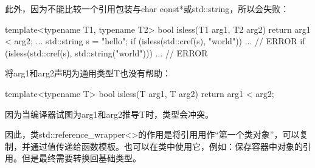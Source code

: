 此外，因为不能比较一个引用包装与char const*或std::string，所以会失败：

\begin{cpp}
template<typename T1, typename T2>
bool isless(T1 arg1, T2 arg2)
{
	return arg1 < arg2;
}
...
std::string s = "hello";
if (isless(std::cref(s), "world")) ... // ERROR
if (isless(std::cref(s), std::string("world"))) ... // ERROR
\end{cpp}

将arg1和arg2声明为通用类型T也没有帮助：

\begin{cpp}
template<typename T>
bool isless(T arg1, T arg2)
{
	return arg1 < arg2;
}
\end{cpp}

因为当编译器试图为arg1和arg2推导T时，类型会冲突。

因此，类std::reference\_wrapper<>的作用是将引用用作“第一个类对象”，可以复制，并通过值传递给函数模板。也可以在类中使用它，例如：保存容器中对象的引用。但是最终需要转换回基础类型。











